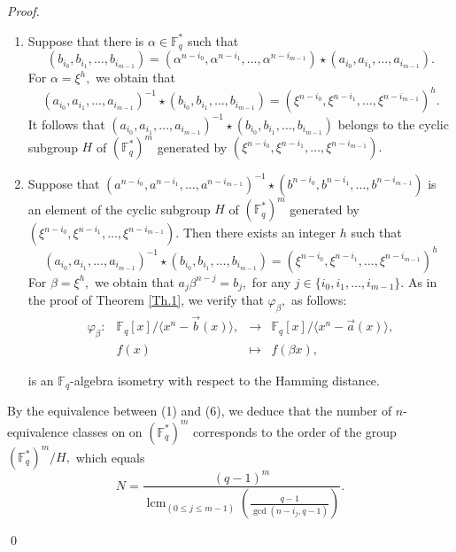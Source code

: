 \documentclass[10pt,a4paper]{amsart}
\newcommand{\Fq}{\mathbb{F}_{q}}
\DeclareMathOperator{\lcm}{lcm}
\begin{document}
\begin{proof}
\begin{enumerate}
$$  (b_{i_0}, b_{i_1},\ldots, b_{i_{m-1}} )=  (\alpha^{n-i_0}, 
\alpha^{n-i_1} , \ldots, \alpha^{n-i_{m-1}})\star( a_{i_0},  a_{i_1}, \ldots, a_{i_{m-1}}).$$ 
\item [(5) $\Rightarrow$ (6)]
Suppose that there is $\alpha\in \Fq^{*}$ such that 
$$  (b_{i_0}, b_{i_1},\ldots, b_{i_{m-1}} )=  (\alpha^{n-i_0}, 
\alpha^{n-i_1} , \ldots, \alpha^{n-i_{m-1}})\star( a_{i_0},  a_{i_1}, \ldots, a_{i_{m-1}}).$$ 
For $\alpha= \xi^h,$ we obtain that 
$$  ( a_{i_0}, a_{i_1},\ldots, a_{i_{m-1}})^{-1}\star(b_{i_0}, b_{i_1},\ldots, b_{i_{m-1}} ) =   (\xi^{n-{i_0}}, \xi^{n-{i_1}} , \ldots, \xi^{n-i_{m-1}})^h .$$
It follows that $  ( a_{i_0},  a_{i_1}, \ldots, a_{i_{m-1}})^{-1}\star( b_{i_0},  b_{i_1}, \ldots, b_{i_{m-1}}) $ belongs to the cyclic subgroup  $H$ of $ (\Fq^{*})^m$ generated by $ (\xi^{n-{i_0}}, \xi^{n-{i_1}} , \ldots, \xi^{n-{i_{m-1}}}) .$
    \item [(6) $\Rightarrow$ (1)]  
     Suppose that $ (a^{n-{i_0}}, a^{n-{i_1}} , \ldots, a^{n-i_{m-1}})^{-1}\star(b^{n-{i_0}}, b^{n-{i_1}} , \ldots, b^{n-i_{m-1}}) $ is an element of the cyclic subgroup  $H$ of $ (\Fq^{*})^m$ generated by
$ (\xi^{n-{i_0}}, \xi^{n-{i_1}} , \ldots, \xi^{n-{i_{m-1}}}) $. Then there exists an integer $ h$ such that 
     $$  ( a_{i_0},  a_{i_1}, \ldots, a_{i_{m-1}})^{-1}\star( b_{i_0},  b_{i_1}, \ldots, b_{i_{m-1}}) =  (\xi^{n-{i_0}}, \xi^{n-{i_1}} , \ldots, \xi^{n-{i_{m-1}}})^h $$
    For $ \beta= \xi^{h}, $ we obtain  that $  a_j \beta^{n-j}= b_j, $ for any $ j\in \{ i_0,i_1,\ldots, i_{m-1}\}.$
As in the proof of Theorem \ref{Th.1}, we verify that  $ \varphi_{\beta}, $ as follows: 
  \begin{equation}
        \begin{array}{cccc}
        \varphi_{\beta} : & \mathbb{F}_q[x]/\langle x^n - \vec{b}(x) \rangle,  & \longrightarrow & \mathbb{F}_q[x] /\langle x^n - \vec{a}(x) \rangle, \\ 
        & f(x) & \longmapsto & f(\beta x),
        \end{array}
    \end{equation} 
	
	is an $\Fq$-algebra isometry with respect to the Hamming distance. 
\end{enumerate}
\noindent By the equivalence between (1) and (6), we deduce that the number of $n$-equivalence classes on on $(\Fq^*)^m$ corresponds to the order of the group $ (\Fq^*)^m/H,$ which equals $$ N=\dfrac{ (q-1)^m}{ \lcm_{ (0 \leq j\leq m-1)}\left(\frac{q-1}{ \gcd(n-i_j,q-1)}\right)}. $$ 

\qed
\end{proof}
\end{document}
